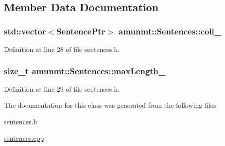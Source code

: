 \subsection{Member Data Documentation}
\subsubsection[{\texorpdfstring{coll\+\_\+}{coll_}}]{\setlength{\rightskip}{0pt plus 5cm}std\+::vector$<${\bf Sentence\+Ptr}$>$ amunmt\+::\+Sentences\+::coll\+\_\+\hspace{0.3cm}{\ttfamily [protected]}}\hypertarget{classamunmt_1_1Sentences_ae2784b113f5764d9e2efe50cf28b4340}{}\label{classamunmt_1_1Sentences_ae2784b113f5764d9e2efe50cf28b4340}


Definition at line 28 of file sentences.\+h.

\subsubsection[{\texorpdfstring{max\+Length\+\_\+}{maxLength_}}]{\setlength{\rightskip}{0pt plus 5cm}size\+\_\+t amunmt\+::\+Sentences\+::max\+Length\+\_\+\hspace{0.3cm}{\ttfamily [protected]}}\hypertarget{classamunmt_1_1Sentences_a9dccc95db296164c8f7aabe70f031f48}{}\label{classamunmt_1_1Sentences_a9dccc95db296164c8f7aabe70f031f48}


Definition at line 29 of file sentences.\+h.



The documentation for this class was generated from the following files\+:\begin{DoxyCompactItemize}
\item 
\hyperlink{sentences_8h}{sentences.\+h}\item 
\hyperlink{sentences_8cpp}{sentences.\+cpp}\end{DoxyCompactItemize}
